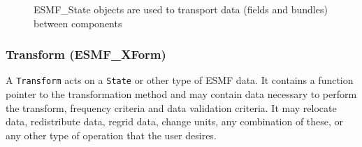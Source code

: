 \begin{figure}
\caption[{ESMF State Role}]{ESMF\_State objects are used to transport data
(fields and bundles) between components}
\label{fig:ESMFSystemDiagram}
\end{figure}

\subsubsection{Transform (ESMF\_XForm)} 
A {\tt Transform} acts on a {\tt State} or other type of 
ESMF data.  It contains a function pointer to the transformation method
and may contain data necessary to perform the transform, frequency 
criteria and data
validation criteria.  It may relocate data, 
redistribute data, regrid data, change units, any combination of these,
or any other type of operation that the user desires.  










